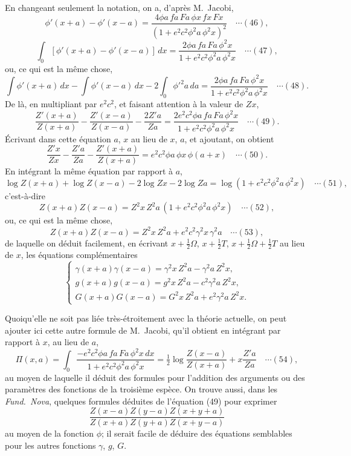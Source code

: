 \documentclass[12pt,a4paper]{article}
\begin{document}
En changeant seulement la notation, on a, d'apr\`es M.~Jacobi,
\[
\phi'(x + a) - \phi'(x - a) = \frac{4\phi a\, fa\, Fa\, \phi x\, fx\, Fx}{(1 + e^2 c^2 \phi^2 a\, \phi^2 x)^2} \quad\cdots(46),
\]
\[
\int_0[\phi'(x + a) - \phi'(x - a)]\, dx = \frac{2\phi a\, fa\, Fa\, \phi^2 x}{1 + e^2 c^2 \phi^2 a\, \phi^2 x} \quad\cdots(47),
\]
ou, ce qui est la m\^eme chose,
\[
\int \phi'(x + a)\, dx - \int \phi'(x - a)\, dx - 2\int_0 \phi'^2 a\, da = \frac{2\phi a\, fa\, Fa\, \phi^2 x}{1 + e^2 c^2 \phi^2 a\, \phi^2 x} \quad\cdots(48).
\]
De l\`a, en multipliant par $e^2 c^2$, et faisant attention \`a la valeur de $Zx$,
\[
\frac{Z'(x + a)}{Z(x + a)} - \frac{Z'(x - a)}{Z(x - a)} - \frac{2Z' a}{Za} = \frac{2 e^2 c^2 \phi a\, fa\, Fa\, \phi^2 x}{1 + e^2 c^2 \phi^2 a\, \phi^2 x} \quad\cdots(49).
\]
\'Ecrivant dans cette \'equation $a$, $x$ au lieu de $x$, $a$, et ajoutant, on obtient
\[
\frac{Z' x}{Zx} - \frac{Z' a}{Za} - \frac{Z'(x + a)}{Z(x + a)} = e^2 c^2 \phi a\, \phi x\, \phi(a + x) \quad\cdots(50).
\]
En int\'egrant la m\^eme \'equation par rapport \`a $a$,
\[
\log Z(x + a) + \log Z(x - a) - 2\log Zx - 2\log Za = \log(1 + e^2 c^2 \phi^2 a\, \phi^2 x) \quad\cdots(51),
\]
c'est-\`a-dire
\[
Z(x + a)Z(x - a) = Z^2 x\, Z^2 a\, (1 + e^2 c^2 \phi^2 a\, \phi^2 x) \quad\cdots(52),
\]
ou, ce qui est la m\^eme chose,
\[
Z(x + a)Z(x - a) = Z^2 x\, Z^2 a + e^2 c^2 \gamma^2 x\, \gamma^2 a \quad\cdots(53),
\]
de laquelle on d\'eduit facilement, en \'ecrivant $x + \tfrac12\Omega$, $x + \tfrac12 T$, $x + \tfrac12\Omega + \tfrac12 T$ au lieu de $x$, les \'equations compl\'ementaires
\[
\left\{\begin{array}{l}
\gamma(x + a)\gamma(x - a) = \gamma^2 x\, Z^2 a - \gamma^2 a\, Z^2 x,\\[2pt]
g(x + a)g(x - a) = g^2 x\, Z^2 a - c^2 \gamma^2 a\, Z^2 x,\\[2pt]
G(x + a)G(x - a) = G^2 x\, Z^2 a + e^2 \gamma^2 a\, Z^2 x.
\end{array}\right. \tag*{(Y)}
\]

\newpage
\setcounter{page}{181}

Quoiqu'elle ne soit pas li\'ee tr\`es-\'etroitement avec la th\'eorie actuelle, on peut ajouter ici cette autre formule de M.~Jacobi, qu'il obtient en int\'egrant par rapport \`a $x$, au lieu de $a$,
\[
\Pi(x, a) = \int_0 \frac{- e^2 c^2 \phi a\, fa\, Fa\, \phi^2 x\, dx}{1 + e^2 c^2 \phi^2 a\, \phi^2 x} = \tfrac12 \log\frac{Z(x - a)}{Z(x + a)} + x\frac{Z' a}{Za} \quad\cdots(54),
\]
au moyen de laquelle il d\'eduit des formules pour l'addition des arguments ou des param\`etres des fonctions de la troisi\`eme esp\`ece. On trouve aussi, dans les \textit{Fund.\ Nova}, quelques formules d\'eduites de l'\'equation (49) pour exprimer
\[
\frac{Z(x - a)Z(y - a)Z(x + y + a)}{Z(x + a)Z(y + a)Z(x + y - a)}
\]
au moyen de la fonction $\phi$; il serait facile de d\'eduire des \'equations semblables pour les autres fonctions $\gamma$, $g$, $G$.
\end{document}
